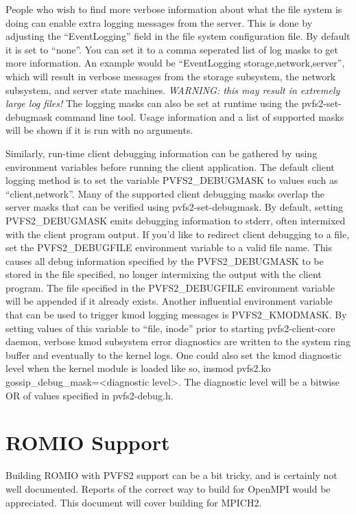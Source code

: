 \documentclass[11pt, letterpaper]{article}
\begin{document}
People who wish to find more verbose information about what the file
system is doing can enable extra logging messages from the server.
This is done by adjusting the ``EventLogging'' field in the file
system configuration file.  By default it is set to ``none''.  You can
set it to a comma seperated list of log masks to get more information.
An example would be ``EventLogging storage,network,server'', which
will result in verbose messages from the storage subsystem, the
network subsystem, and server state machines.  \emph{WARNING: this may
result in extremely large log files!}  The logging masks can also be
set at runtime using the pvfs2-set-debugmask command line tool.  Usage
information and a list of supported masks will be shown if it is run
with no arguments.

Similarly, run-time client debugging information can be gathered by
using environment variables before running the client application.
The default client logging method is to set the variable
PVFS2\_DEBUGMASK to values such as ``client,network''.  Many of the
supported client debugging masks overlap the server masks that can be
verified using pvfs2-set-debugmask.  By default, setting
PVFS2\_DEBUGMASK emits debugging information to stderr, often
intermixed with the client program output.  If you'd like to redirect
client debugging to a file, set the PVFS2\_DEBUGFILE environment
variable to a valid file name.  This causes all debug information
specified by the PVFS2\_DEBUGMASK to be stored in the file specified,
no longer intermixing the output with the client program.  The file
specified in the PVFS2\_DEBUGFILE environment variable will be
appended if it already exists. 
Another influential environment variable that can be used to trigger
kmod logging messages is PVFS2\_KMODMASK. By setting values of this variable
to ``file, inode'' prior to starting pvfs2-client-core daemon,
verbose kmod subsystem error diagnostics are written to the system ring buffer
and eventually to the kernel logs.
One could also set the kmod diagnostic level when the kernel module is loaded
like so, insmod pvfs2.ko gossip\_debug\_mask=<diagnostic level>.
The diagnostic level will be a bitwise OR of values specified in pvfs2-debug.h.

\section{ROMIO Support}
\label{sec:romio}

Building ROMIO with PVFS2 support can be a bit tricky, and is certainly not
well documented.  Reports of the correct way to build for OpenMPI would be
appreciated.  This document will cover building for MPICH2. 
\end{document}
